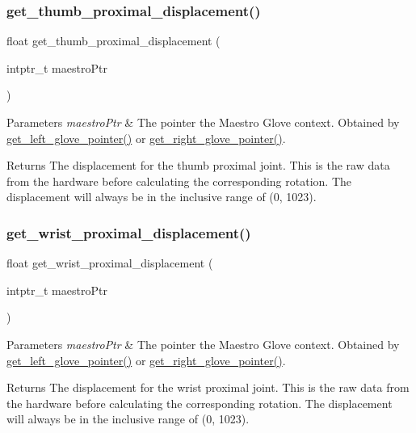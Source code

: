 \subsubsection{\texorpdfstring{get\+\_\+thumb\+\_\+proximal\+\_\+displacement()}{get\_thumb\_proximal\_displacement()}}
{\footnotesize\ttfamily float get\+\_\+thumb\+\_\+proximal\+\_\+displacement (\begin{DoxyParamCaption}\item[{intptr\+\_\+t}]{maestro\+Ptr }\end{DoxyParamCaption})}


\begin{DoxyParams}{Parameters}
{\em maestro\+Ptr} & The pointer the Maestro Glove context. Obtained by \hyperlink{group__glove_management_ga63ce3c99d4a8b8db851b22af9185764e}{get\+\_\+left\+\_\+glove\+\_\+pointer()} or \hyperlink{group__glove_management_ga9b8fd9d91aeac3f8da50f7a7eba0c32b}{get\+\_\+right\+\_\+glove\+\_\+pointer()}. \\
\hline
\end{DoxyParams}
\begin{DoxyReturn}{Returns}
The displacement for the thumb proximal joint. This is the raw data from the hardware before calculating the corresponding rotation. The displacement will always be in the inclusive range of (0, 1023). 
\end{DoxyReturn}
\mbox{\label{group__displacement_access_gab799e09f1b944ca87b1567a9a9ae2ee4}} 
\subsubsection{\texorpdfstring{get\+\_\+wrist\+\_\+proximal\+\_\+displacement()}{get\_wrist\_proximal\_displacement()}}
{\footnotesize\ttfamily float get\+\_\+wrist\+\_\+proximal\+\_\+displacement (\begin{DoxyParamCaption}\item[{intptr\+\_\+t}]{maestro\+Ptr }\end{DoxyParamCaption})}


\begin{DoxyParams}{Parameters}
{\em maestro\+Ptr} & The pointer the Maestro Glove context. Obtained by \hyperlink{group__glove_management_ga63ce3c99d4a8b8db851b22af9185764e}{get\+\_\+left\+\_\+glove\+\_\+pointer()} or \hyperlink{group__glove_management_ga9b8fd9d91aeac3f8da50f7a7eba0c32b}{get\+\_\+right\+\_\+glove\+\_\+pointer()}. \\
\hline
\end{DoxyParams}
\begin{DoxyReturn}{Returns}
The displacement for the wrist proximal joint. This is the raw data from the hardware before calculating the corresponding rotation. The displacement will always be in the inclusive range of (0, 1023). 
\end{DoxyReturn}
